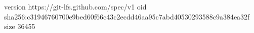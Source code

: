 version https://git-lfs.github.com/spec/v1
oid sha256:c31946760700e9bed60f66c43c2ecdd46aa95c7abd40530293588c9a384ea32f
size 36455
